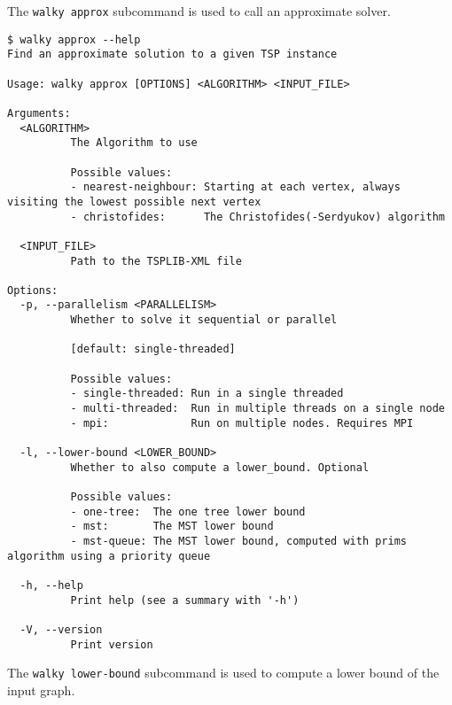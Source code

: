 The \texttt{walky approx} subcommand is used to call an approximate solver.
\begin{verbatim}
$ walky approx --help
Find an approximate solution to a given TSP instance

Usage: walky approx [OPTIONS] <ALGORITHM> <INPUT_FILE>

Arguments:
  <ALGORITHM>
          The Algorithm to use

          Possible values:
          - nearest-neighbour: Starting at each vertex, always visiting the lowest possible next vertex
          - christofides:      The Christofides(-Serdyukov) algorithm

  <INPUT_FILE>
          Path to the TSPLIB-XML file

Options:
  -p, --parallelism <PARALLELISM>
          Whether to solve it sequential or parallel
          
          [default: single-threaded]

          Possible values:
          - single-threaded: Run in a single threaded
          - multi-threaded:  Run in multiple threads on a single node
          - mpi:             Run on multiple nodes. Requires MPI

  -l, --lower-bound <LOWER_BOUND>
          Whether to also compute a lower_bound. Optional

          Possible values:
          - one-tree:  The one tree lower bound
          - mst:       The MST lower bound
          - mst-queue: The MST lower bound, computed with prims algorithm using a priority queue

  -h, --help
          Print help (see a summary with '-h')

  -V, --version
          Print version
\end{verbatim}

The \texttt{walky lower-bound} subcommand is used to compute a lower bound of the input graph.

